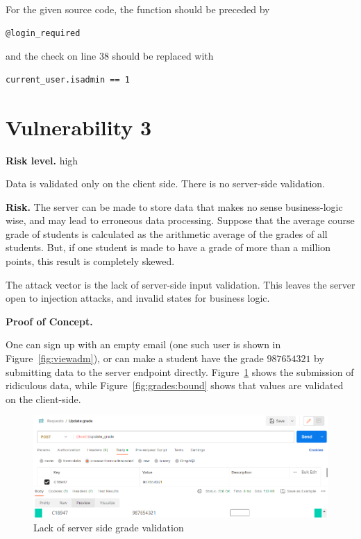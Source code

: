 \documentclass[parskip=half]{scrartcl}
\newcommand{\figref}[1]{Figure~\ref{#1}}
\begin{document}
For the given source code, the function should be preceded by
\begin{verbatim}
@login_required
\end{verbatim}
and the check on line $38$ should be replaced with
\begin{verbatim}
current_user.isadmin == 1
\end{verbatim}


\clearpage
\newpage

\section*{Vulnerability 3}

\textbf{Risk level.} high

Data is validated only on the client side. There is no server-side validation.

\textbf{Risk.} The server can be made to store data that makes no sense
business-logic wise, and may lead to erroneous data processing. Suppose that
the average course grade of students is calculated as the arithmetic average of
the grades of all students. But, if one student is made to have a grade of
more than a million points, this result is completely skewed.

The attack vector is the lack of server-side input validation. This leaves the
server open to injection attacks, and invalid states for business logic.

\textbf{Proof of Concept.}

One can sign up with an empty email (one such user is shown in
\figref{fig:viewadm}), or can make a student have the grade $987654321$ by
submitting data to the server endpoint directly. \figref{fig:grades:absurd}
shows the submission of ridiculous data, while \figref{fig:grades:bound} shows
that values are validated on the client-side.

\begin{figure}[h]
    \centering
    \includegraphics[width=\textwidth]{absurd_grade}
    \caption{Lack of server side grade validation}
    \label{fig:grades:absurd}
\end{figure}
\end{document}
